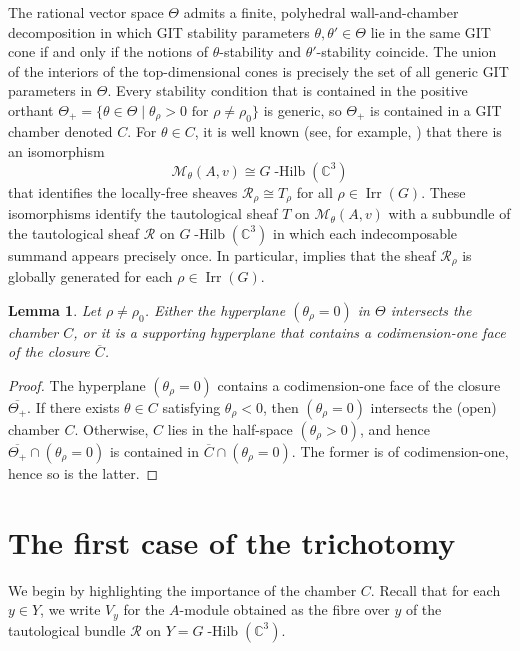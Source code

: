 \documentclass[11pt,reqno]{amsart}
\numberwithin{equation}{section}
\newtheorem{lemma}[theorem]{Lemma}
\theoremstyle{definition}
\newcommand{\CC}{\ensuremath{\mathbb{C}}}
\newcommand{\ghilb}{\ensuremath{G}\operatorname{-Hilb}}
\newcommand{\0}{\operatorname{0}}
\newcommand{\Irr}{\operatorname{Irr}}
\begin{document}
 
The rational vector space $\Theta$ admits a finite, polyhedral wall-and-chamber decomposition in which GIT stability parameters $\theta, \theta'\in \Theta$ lie in the same GIT cone if and only if the notions of $\theta$-stability and $\theta'$-stability coincide. The union of the interiors of the top-dimensional cones is precisely the set of all  generic GIT parameters in $\Theta$. Every stability condition that is contained in the positive orthant $\Theta_+=\big\{\theta\in \Theta \mid \theta_\rho > 0 \text{ for }\rho\neq \rho_0\big\}$ is generic, so $\Theta_+$ is contained in a GIT chamber denoted $C$. For $\theta\in C$, it is well known (see, for example, \cite[Proposition~5.9]{Crawthesis}) that there is an isomorphism  
\[
\mathcal{M}_\theta(A,v)\cong \ghilb(\mathbb{C}^3)
\]
 that identifies the locally-free sheaves $\mathcal{R}_\rho\cong T_\rho$ for all $\rho\in \Irr(G)$. These isomorphisms identify the tautological sheaf $T$ on $\mathcal{M}_\theta(A,v)$ with a subbundle of the tautological sheaf $\mathcal{R}$ on $\ghilb(\mathbb{C}^3)
$ in which each indecomposable summand appears precisely once. In particular,  \cite[Corollary~2.4]{CIK18} implies that the sheaf $\mathcal{R}_\rho$ is globally generated for each $\rho \in \Irr(G)$.

\begin{lemma}
\label{lem:C}
  Let $\rho\neq \rho_0$. Either the hyperplane $(\theta_\rho=0)$ in $\Theta$ intersects the chamber $C$, or it is a supporting hyperplane that contains a codimension-one face of the closure $\overline{C}$.   
\end{lemma}
\begin{proof}
The hyperplane $(\theta_\rho=0)$ contains a codimension-one face of the closure $\overline{\Theta_+}$. If there exists $\theta\in C$ satisfying $\theta_\rho<0$, then $(\theta_\rho=0)$ intersects the (open) chamber $C$. Otherwise, $C$ lies in the half-space $(\theta_\rho>0)$, and hence $\overline{\Theta_+}\cap (\theta_\rho=0)$ is contained in $\overline{C}\cap (\theta_\rho=0)$. The former is of codimension-one, hence so is the latter.
\end{proof}


 
   \section{The first case of the trichotomy}
 We begin by highlighting the importance of the chamber $C$. Recall that for each $y\in Y$, we write $V_y$ for the $A$-module obtained as the fibre over $y$ of the tautological bundle $\mathcal{R}$ on
 $Y=\ghilb(\CC^3)$. 
\end{document}
